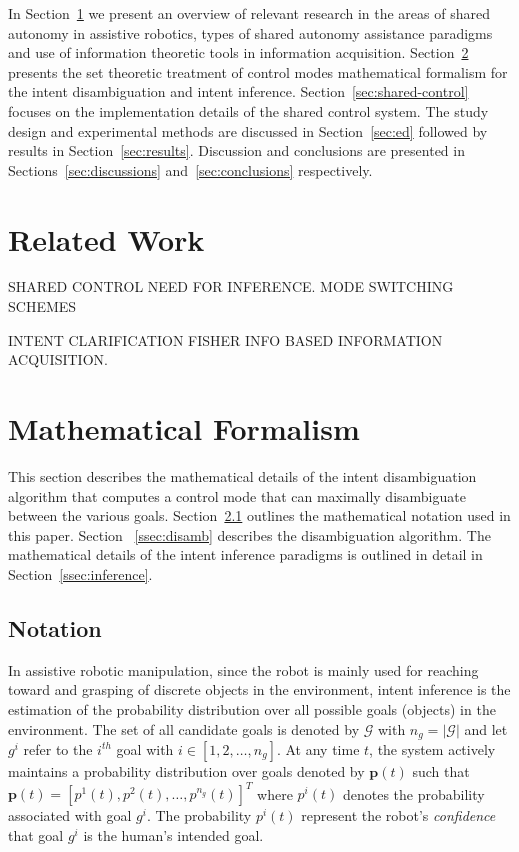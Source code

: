\documentclass[conference]{IEEEtran}
\begin{document}
In Section~\ref{sec:related_work} we present an overview of relevant research in the areas of shared autonomy in assistive robotics, types of shared autonomy assistance paradigms and use of information theoretic tools in information acquisition. Section~\ref{sec:math} presents the set theoretic treatment of control modes mathematical formalism for the intent disambiguation and intent inference. Section~\ref{sec:shared-control} focuses on the implementation details of the shared control system. The study design and experimental methods are discussed in Section~\ref{sec:ed} followed by results in Section~\ref{sec:results}. Discussion and conclusions are presented in Sections~\ref{sec:discussions} and~\ref{sec:conclusions} respectively. 


\section{Related Work}\label{sec:related_work}

SHARED CONTROL
NEED FOR INFERENCE.
MODE SWITCHING SCHEMES

INTENT CLARIFICATION
FISHER INFO BASED INFORMATION ACQUISITION. 

\section{Mathematical Formalism}\label{sec:math}
This section describes the mathematical details of the intent disambiguation algorithm that computes a control mode that can maximally disambiguate between the various goals. Section~\ref{ssec:notation} outlines the mathematical notation used in this paper. Section ~\ref{ssec:disamb} describes the disambiguation algorithm. The mathematical details of the intent inference paradigms is outlined in detail in Section~\ref{ssec:inference}.
\subsection{Notation}\label{ssec:notation}
 In assistive robotic manipulation, since the robot is mainly used for reaching toward and grasping of discrete objects in the environment, intent inference is the estimation of the probability distribution over all possible goals (objects) in the environment. The set of all candidate goals is denoted by $\mathcal{G}$ with $n_g = \vert\mathcal{G}\vert$ and let $g^i$ refer to the $i^{th}$ goal with $i \in [1,2,\dots, n_g]$. 
At any time $t$, the system actively maintains a probability distribution over goals denoted by $\boldsymbol{p}(t)$ such that $\boldsymbol{p}(t) = [p^1(t), p^2(t),\dots, p^{n_g}(t)]^{T}$ where $p^i(t)$ denotes the probability associated with goal $g^i$.  The probability $p^i(t)$ represent the robot's \textit{confidence} that goal $g^i$ is the human's intended goal. 
\end{document}
